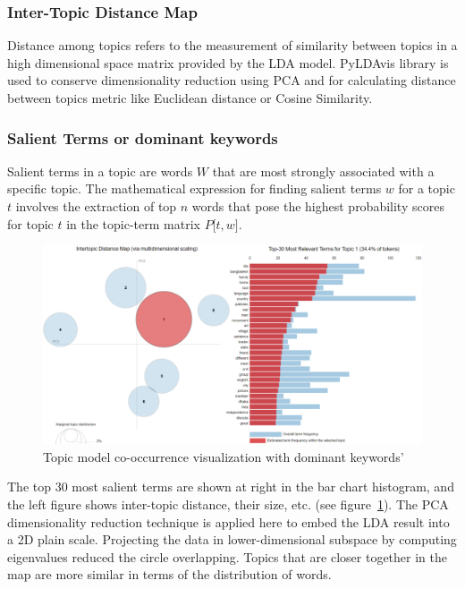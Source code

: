 \documentclass[sn-mathphys,Numbered]{sn-jnl}%
\theoremstyle{thmstyleone}%
\theoremstyle{thmstyletwo}%
\theoremstyle{thmstylethree}%
\begin{document}
\subsubsection{Inter-Topic Distance Map}

Distance among topics refers to the measurement of similarity between topics in a high dimensional space matrix provided by the LDA model. PyLDAvis library is used to conserve dimensionality reduction using PCA and for calculating distance between topics metric like Euclidean distance or Cosine Similarity. 

\subsubsection{Salient Terms or dominant keywords} Salient terms in a topic are words \(W\) that are most strongly associated with a specific topic. The mathematical expression for finding salient terms \(w\) for a topic \(t\) involves the extraction of top \(n\) words that pose the highest probability scores for topic \(t\) in the topic-term matrix \(P\lbrack t,w\rbrack\).

\begin{figure}[h]
\centerline{\includegraphics[width=\textwidth]{pyldvis.png}}
\caption{Topic model co-occurrence visualization with dominant keywords'}
\label{Relative_weight_pyldvis}
\end{figure}

The top 30 most salient terms are shown at right in the bar chart histogram, and the left figure shows inter-topic distance, their size, etc. (see figure~\ref{Relative_weight_pyldvis}). The PCA dimensionality reduction technique is applied here to embed the LDA result into a 2D plain scale. Projecting the data in lower-dimensional subspace by computing eigenvalues reduced the circle overlapping. Topics that are closer together in the map are more similar in terms of the distribution of words. 
\end{document}
